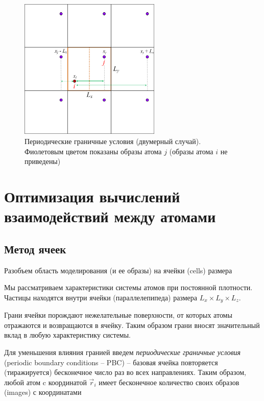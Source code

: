 \documentclass[a4paper, 12pt]{article}
\begin{document}
\begin{figure}[h]
\centering
\includegraphics[width=0.6\textwidth]{images/pbc.png}
\caption{Периодические граничные условия (двумерный случай). Фиолетовым цветом показаны образы атома $j$ (образы атома $i$ не приведены)}
\label{fig:pbc}
\end{figure}





\section{Оптимизация вычислений взаимодействий между атомами}

\subsection{Метод ячеек}

Разобъем область моделирования (и ее образы) на ячейки (cells) размера 

   
Мы рассматриваем характеристики системы атомов при постоянной плотности. Частицы находятся внутри ячейки (параллелепипеда) размера $L_x \times L_y \times L_z$. 

Грани ячейки порождают нежелательные поверхности, от которых атомы отражаются и возвращаются в ячейку.  Таким образом грани вносят значительный вклад в любую характеристику системы.

Для уменьшения влияния гранией введем \textit{периодические граничные условия} (periodic boundary conditions -- PBC) -- базовая ячейка повторяется (тиражируется) бесконечное число раз во всех направлениях. Таким образом, любой атом c координатой $\vec{r}_i$ имеет бесконечное количество своих образов (images) с координатами 
\end{document}
